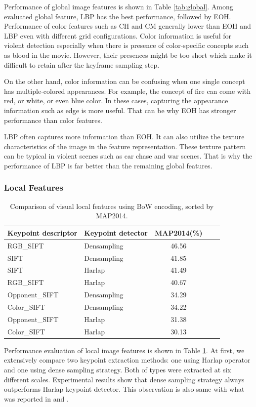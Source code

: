 \documentclass[twocolumn]{bmcart}%
\begin{document}
Performance of global image features is shown in Table \ref{tab:global}. Among evaluated global feature, LBP has the best performance, followed by EOH. Performance of color features such as CH and CM generally lower than EOH and LBP even with different grid configurations. Color information is useful for violent detection especially when there is presence of color-specific concepts such as blood in the movie. However, their presences might be too short which make it difficult to retain after the keyframe sampling step.

On the other hand, color information can be confusing when one single concept has multiple-colored appearances. For example, the concept of fire can come with red, or white, or even blue color. In these cases, capturing the appearance information such as edge is more useful. That can be why EOH has stronger performance than color features. 

LBP often captures more information than EOH. It can also utilize the texture characteristics of the image in the feature representation. These texture pattern can be typical in violent scenes such as car chase and war scenes. That is why the performance of LBP is far better than the remaining global features.
\subsubsection{Local Features}

\begin{table}
	\centering
	\caption{Comparison of visual local features using BoW encoding, sorted by MAP2014.}
	\begin{tabular}{llccc}
		\hline
		Keypoint descriptor & Keypoint detector & MAP2014(\%) \\ \hline
		RGB\_SIFT & Densampling & 46.56 \\
		SIFT  & Densampling & 41.85 \\
		SIFT  & Harlap & 41.49 \\
		RGB\_SIFT & Harlap & 40.67 \\
		Opponent\_SIFT & Densampling  & 34.29 \\
		Color\_SIFT & Densampling  & 34.22 \\
		Opponent\_SIFT & Harlap & 31.38 \\
		Color\_SIFT & Harlap & 30.13 \\ \hline
	\end{tabular}%
	\label{tab:local}%
\end{table}%
Performance evaluation of local image features is shown in Table \ref{tab:local}. At first, we extensively compare two keypoint extraction methods: one using Harlap operator and one using dense sampling strategy. Both of types were extracted at six different scales. Experimental results show that dense sampling strategy always outperforms Harlap keypoint detector. This observation is also same with what was reported in \cite{bosch2006scene} and \cite{bosch2007image}.
\end{document}
